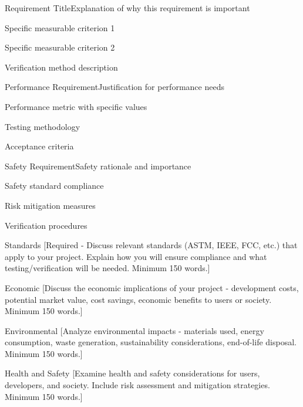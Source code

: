 \documentclass[final]{../designreport}
\begin{document}
\engineeringreqs

\begin{engineeringreq}{1}{Requirement Title}{Explanation of why this requirement is important}
    \item Specific measurable criterion 1
    \item Specific measurable criterion 2
    \item Verification method description
\end{engineeringreq}

\begin{engineeringreq}{2}{Performance Requirement}{Justification for performance needs}
    \item Performance metric with specific values
    \item Testing methodology
    \item Acceptance criteria
\end{engineeringreq}

\begin{engineeringreq}{3}{Safety Requirement}{Safety rationale and importance}
    \item Safety standard compliance
    \item Risk mitigation measures
    \item Verification procedures
\end{engineeringreq}

\impactstatements

\begin{impactstatement}{Standards}
[Required - Discuss relevant standards (ASTM, IEEE, FCC, etc.) that apply to your project. Explain how you will ensure compliance and what testing/verification will be needed. Minimum 150 words.]
\end{impactstatement}

\begin{impactstatement}{Economic}
[Discuss the economic implications of your project - development costs, potential market value, cost savings, economic benefits to users or society. Minimum 150 words.]
\end{impactstatement}

\begin{impactstatement}{Environmental}
[Analyze environmental impacts - materials used, energy consumption, waste generation, sustainability considerations, end-of-life disposal. Minimum 150 words.]
\end{impactstatement}

\begin{impactstatement}{Health and Safety}
[Examine health and safety considerations for users, developers, and society. Include risk assessment and mitigation strategies. Minimum 150 words.]
\end{impactstatement}
\end{document}
